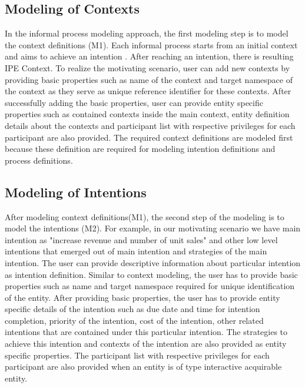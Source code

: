 \subsection{Modeling of Contexts}
In the informal process modeling approach, the first modeling step is to model the context definitions (M1). Each informal process starts from an initial context and aims to achieve an intention \cite{Sungur2014a}. After reaching an intention, there is resulting IPE Context. To realize the motivating scenario, user can add new contexts by providing basic properties such as name of the context and target namespace of the context as they serve as unique reference identifier for these contexts. After successfully adding the basic properties, user can provide entity specific properties such as contained contexts inside the main context, entity definition details about the contexts and participant list with respective privileges for each participant are also provided. The required context definitions are modeled first because these definition are required for modeling intention definitions and process definitions.  

\subsection{Modeling of Intentions}
After modeling context definitions(M1), the second step of the modeling is to model the intentions (M2). For example, in our motivating scenario we have main intention as "increase revenue and number of unit sales" and other low level intentions that emerged out of main intention and strategies of the main intention. The user can provide descriptive information about particular intention as intention definition. Similar to context modeling, the user has to provide basic properties such as name and target namespace required for unique identification of the entity. After providing basic properties, the user has to provide entity specific details of the intention such as due date and time for intention completion, priority of the intention, cost of the intention, other related intentions that are contained under this particular intention. The strategies to achieve this intention and contexts of the intention are also provided as entity specific properties. The participant list with respective privileges for each participant are also provided when an entity is of type interactive acquirable entity. 

